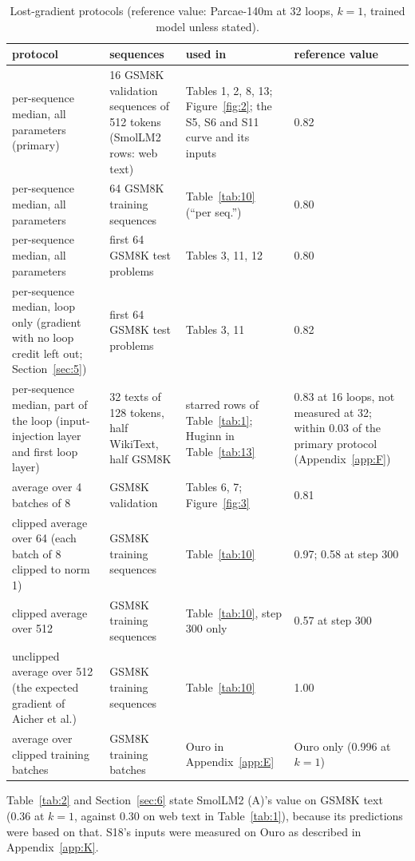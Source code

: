 \documentclass[10pt]{article}
\begin{document}
\begin{table}[!htbp]
\centering\small
\caption{Lost-gradient protocols (reference value: Parcae-140m at 32 loops, $k = 1$, trained model unless stated).}
\begin{tabularx}{\linewidth}{XXXX}
\toprule
protocol & sequences & used in & reference value \\
\midrule
per-sequence median, all parameters (primary) & 16 GSM8K validation sequences of 512 tokens (SmolLM2 rows: web text) & Tables 1, 2, 8, 13; Figure~\ref{fig:2}; the S5, S6 and S11 curve and its inputs & 0.82 \\
per-sequence median, all parameters & 64 GSM8K training sequences & Table~\ref{tab:10} (``per seq.'') & 0.80 \\
per-sequence median, all parameters & first 64 GSM8K test problems & Tables 3, 11, 12 & 0.80 \\
per-sequence median, loop only (gradient with no loop credit left out; Section~\ref{sec:5}) & first 64 GSM8K test problems & Tables 3, 11 & 0.82 \\
per-sequence median, part of the loop (input-injection layer and first loop layer) & 32 texts of 128 tokens, half WikiText, half GSM8K & starred rows of Table~\ref{tab:1}; Huginn in Table~\ref{tab:13} & 0.83 at 16 loops, not measured at 32; within 0.03 of the primary protocol (Appendix~\ref{app:F}) \\
average over 4 batches of 8 & GSM8K validation & Tables 6, 7; Figure~\ref{fig:3} & 0.81 \\
clipped average over 64 (each batch of 8 clipped to norm 1) & GSM8K training sequences & Table~\ref{tab:10} & 0.97; 0.58 at step 300 \\
clipped average over 512 & GSM8K training sequences & Table~\ref{tab:10}, step 300 only & 0.57 at step 300 \\
unclipped average over 512 (the expected gradient of Aicher et al.) & GSM8K training sequences & Table~\ref{tab:10} & 1.00 \\
average over clipped training batches & GSM8K training batches & Ouro in Appendix~\ref{app:E} & Ouro only (0.996 at $k = 1$) \\
\bottomrule
\end{tabularx}
\label{tab:15}
\end{table}


Table~\ref{tab:2} and Section~\ref{sec:6} state SmolLM2 (A)'s value on GSM8K text (0.36 at $k = 1$, against 0.30 on web text in Table~\ref{tab:1}), because its predictions were based on that. S18's inputs were measured on Ouro as described in Appendix~\ref{app:K}.
\end{document}
